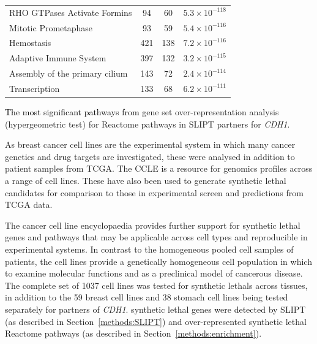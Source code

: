 \begin{table}[!b]
{\begin{threeparttable}
\begin{tabular}{lccc}
  \rowcolor{black!10}
  RHO GTPases Activate Formins &  94 &  60 & $5.3 \times 10^{-118}$ \\ 
  \rowcolor{black!5}
  Mitotic Prometaphase &  93 &  59 & $5.4 \times 10^{-116}$ \\ 
  \rowcolor{black!10}
  Hemostasis & 421 & 138 & $7.2 \times 10^{-116}$ \\ 
  \rowcolor{black!5}
  Adaptive Immune System & 397 & 132 & $3.2 \times 10^{-115}$ \\ 
  \rowcolor{black!10}
  Assembly of the primary cilium & 143 &  72 & $2.4 \times 10^{-114}$ \\ 
  \rowcolor{black!5}
  Transcription & 133 &  68 & $6.2 \times 10^{-111}$ \\ 
   \hline
\end{tabular}
\begin{tablenotes}
\raggedright %
\textcolor{black}{The most significant pathways from g}ene set over-representation analysis (hypergeometric test) for Reactome \glspl{pathway} in \gls{SLIPT} partners for \textit{CDH1}.
\end{tablenotes}
\end{threeparttable}
}
\end{table}

As breast cancer cell lines are the experimental system in which many cancer genetics and drug targets are investigated, these were analysed in addition to patient samples from \gls{TCGA}. The CCLE is a resource for \glspl{genomic} profiles across a range of cell lines. These have also been used to generate \gls{synthetic lethal} candidates for comparison to those in experimental screen and predictions from \gls{TCGA}  data.

The cancer cell line encyclopaedia provides further support for \gls{synthetic lethal} genes and \glspl{pathway} that may be applicable across cell types and reproducible in experimental systems. In contrast to the homogeneous pooled cell samples of patients,  the cell lines provide a genetically homogeneous cell population in which to examine molecular functions and as a preclinical model of cancerous disease. The complete set of 1037 cell lines was tested for \glspl{synthetic lethal} across tissues, in addition to the 59 breast cell lines and 38 stomach cell lines being tested separately for partners of \textit{CDH1}. \Gls{synthetic lethal} genes were detected by \gls{SLIPT} (as described in Section~\ref{methods:SLIPT}) and over-represented \gls{synthetic lethal} Reactome \glspl{pathway} (as described in Section~\ref{methods:enrichment}). 

